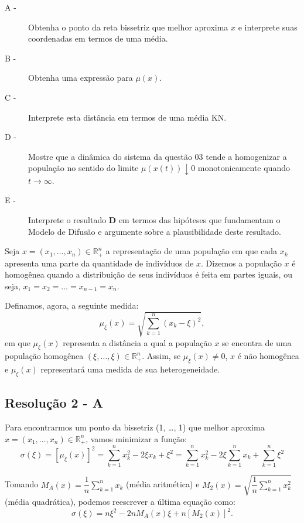 \begin{description}
\item[A -] Obtenha o ponto da reta bissetriz que melhor aproxima \(x\) e interprete suas coordenadas em termos de uma média.
\item[B -] Obtenha uma expressão para \(\mu(x)\).
\item[C -] Interprete esta distância em termos de uma média KN.
\item[D -] Mostre que a dinâmica do sistema da questão 03 tende a homogenizar a população no sentido do limite \(\mu(x(t)) \downarrow 0\) monotonicamente quando \(t \to \infty\).
\item[E -] Interprete o resultado \textbf{D} em termos das hipóteses que fundamentam o Modelo de Difusão e argumente sobre a plausibilidade deste resultado.
\end{description}


\clearpage

Seja \(x = (x_1, \ldots, x_n) \in \mathbb{R}_+^n\) a representação de uma população em que cada \(x_k\) apresenta uma parte da quantidade de indivíduos de \(x\). Dizemos a população \(x\) é homogênea quando a distribuição de seus indivíduos é feita em partes iguais, ou seja, \(x_1 = x_2 = \ldots = x_{n-1} = x_n\).

Definamos, agora, a seguinte medida:
\begin{equation}
\mu_\xi(x) = \sqrt{\displaystyle\sum_{k=1}^{n} (x_k-\xi)^2},
\end{equation}
em que \(\mu_\xi(x)\) representa a distância a qual a população \(x\) se encontra de uma população homogênea \((\xi, \ldots, \xi) \in \mathbb{R}_+^n\). Assim, se \(\mu_\xi(x) \ne 0\), \(x\) é não homogênea e \(\mu_\xi(x)\) representará uma medida de sua heterogeneidade.




\subsection*{\blue Resolução 2 - \textbf{A}}

Para encontrarmos um ponto da bissetriz (1, \ldots, 1) que melhor aproxima \(x = (x_1, \ldots, x_n) \in \mathbb{R}_+^n\), vamos minimizar a função:
\[
\sigma(\xi)
= [\mu_\xi(x)]^2
= \displaystyle\sum_{k=1}^n x_k^2 - 2\xi x_k + \xi^2
= \displaystyle\sum_{k=1}^n x_k^2 - 2\xi \sum_{k=1}^n x_k + \sum_{k=1}^n \xi^2
\]

Tomando \(M_A(x) = \dfrac{1}{n}\displaystyle\sum_{k=1}^n x_k\) (média aritmética) e \(M_2(x) = \sqrt{\dfrac{1}{n}\displaystyle\sum_{k=1}^n x_k^2}\) (média quadrática), podemos reescrever a última equação como:
\[
\sigma(\xi) = n \xi^2 -2n M_A(x)\xi+n [M_2(x)]^2. 
\]

